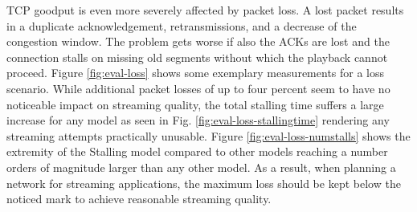 TCP goodput is even more severely affected by packet loss. A lost packet results in a duplicate acknowledgement, retransmissions, and a decrease of the congestion window. The problem gets worse if also the ACKs are lost and the connection stalls on missing old segments without which the playback cannot proceed. Figure \ref{fig:eval-loss} shows some exemplary measurements for a loss scenario. While additional packet losses of up to four percent seem to have no noticeable impact on streaming quality, the total stalling time suffers a large increase for any model as seen in Fig. \ref{fig:eval-loss-stallingtime} rendering any streaming attempts practically unusable. Figure \ref{fig:eval-loss-numstalls} shows the extremity of the Stalling model compared to other models reaching a number orders of magnitude larger than any other model.
As a result, when planning a network for streaming applications, the maximum loss should be kept below the noticed mark to achieve reasonable streaming quality. 


